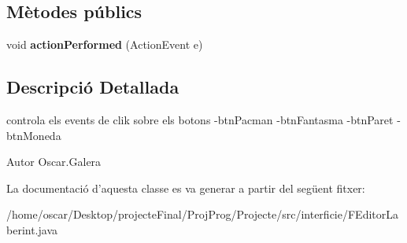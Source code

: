 \subsection*{Mètodes públics}
\begin{DoxyCompactItemize}
\item 
\hypertarget{classinterficie_1_1_f_editor_laberint_1_1_action_canviar_element_seleccionat_a98e2406cd1e08d75d5b09181395420cf}{void {\bfseries action\+Performed} (Action\+Event e)}\label{classinterficie_1_1_f_editor_laberint_1_1_action_canviar_element_seleccionat_a98e2406cd1e08d75d5b09181395420cf}

\end{DoxyCompactItemize}


\subsection{Descripció Detallada}
controla els events de clik sobre els botons -\/btn\+Pacman -\/btn\+Fantasma -\/btn\+Paret -\/btn\+Moneda 

\begin{DoxyAuthor}{Autor}
Oscar.\+Galera 
\end{DoxyAuthor}


La documentació d'aquesta classe es va generar a partir del següent fitxer\+:\begin{DoxyCompactItemize}
\item 
/home/oscar/\+Desktop/projecte\+Final/\+Proj\+Prog/\+Projecte/src/interficie/F\+Editor\+Laberint.\+java\end{DoxyCompactItemize}

